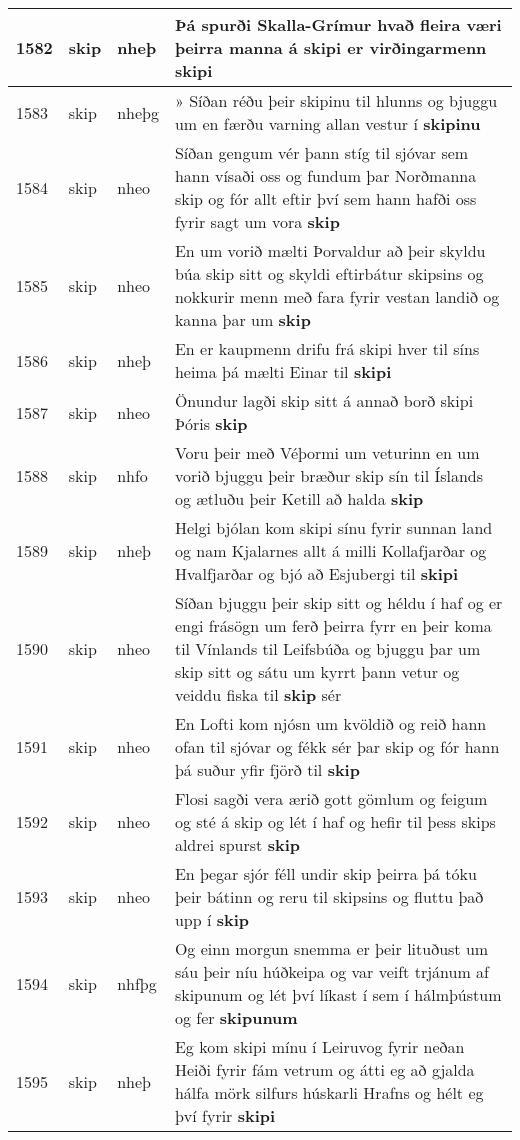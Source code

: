\documentclass{article}
\begin{document}
\begin{longtable}{p{1cm}|p{1cm}|p{1cm}|p{13cm}}
\hline
1582&skip&nheþ&Þá spurði Skalla-Grímur hvað fleira væri þeirra manna á skipi er virðingarmenn \textbf{skipi} \\
\hline
1583&skip&nheþg&» Síðan réðu þeir skipinu til hlunns og bjuggu um en færðu varning allan vestur í \textbf{skipinu} \\
\hline
1584&skip&nheo&Síðan gengum vér þann stíg til sjóvar sem hann vísaði oss og fundum þar Norðmanna skip og fór allt eftir því sem hann hafði oss fyrir sagt um vora \textbf{skip} \\
\hline
1585&skip&nheo&En um vorið mælti Þorvaldur að þeir skyldu búa skip sitt og skyldi eftirbátur skipsins og nokkurir menn með fara fyrir vestan landið og kanna þar um \textbf{skip} \\
\hline
1586&skip&nheþ&En er kaupmenn drifu frá skipi hver til síns heima þá mælti Einar til \textbf{skipi} \\
\hline
1587&skip&nheo&Önundur lagði skip sitt á annað borð skipi Þóris \textbf{skip} \\
\hline
1588&skip&nhfo&Voru þeir með Véþormi um veturinn en um vorið bjuggu þeir bræður skip sín til Íslands og ætluðu þeir Ketill að halda \textbf{skip} \\
\hline
1589&skip&nheþ&Helgi bjólan kom skipi sínu fyrir sunnan land og nam Kjalarnes allt á milli Kollafjarðar og Hvalfjarðar og bjó að Esjubergi til \textbf{skipi} \\
\hline
1590&skip&nheo&Síðan bjuggu þeir skip sitt og héldu í haf og er engi frásögn um ferð þeirra fyrr en þeir koma til Vínlands til Leifsbúða og bjuggu þar um skip sitt og sátu um kyrrt þann vetur og veiddu fiska til \textbf{skip} sér\\
\hline
1591&skip&nheo&En Lofti kom njósn um kvöldið og reið hann ofan til sjóvar og fékk sér þar skip og fór hann þá suður yfir fjörð til \textbf{skip} \\
\hline
1592&skip&nheo&Flosi sagði vera ærið gott gömlum og feigum og sté á skip og lét í haf og hefir til þess skips aldrei spurst \textbf{skip} \\
\hline
1593&skip&nheo&En þegar sjór féll undir skip þeirra þá tóku þeir bátinn og reru til skipsins og fluttu það upp í \textbf{skip} \\
\hline
1594&skip&nhfþg&Og einn morgun snemma er þeir lituðust um sáu þeir níu húðkeipa og var veift trjánum af skipunum og lét því líkast í sem í hálmþústum og fer \textbf{skipunum} \\
\hline
1595&skip&nheþ&Eg kom skipi mínu í Leiruvog fyrir neðan Heiði fyrir fám vetrum og átti eg að gjalda hálfa mörk silfurs húskarli Hrafns og hélt eg því fyrir \textbf{skipi} \\

\end{longtable}
\end{document}
